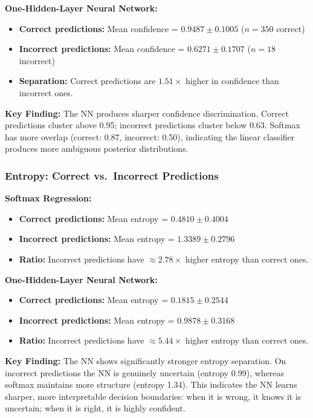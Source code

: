 \documentclass[sigconf,screen,nonacm]{acmart}
\begin{document}
\noindent\textbf{One-Hidden-Layer Neural Network:}
\begin{itemize}
    \item \textbf{Correct predictions:} Mean confidence = $0.9487 \pm 0.1005$ ($n=350$ correct)
    \item \textbf{Incorrect predictions:} Mean confidence = $0.6271 \pm 0.1707$ ($n=18$ incorrect)
    \item \textbf{Separation:} Correct predictions are $1.51\times$ higher in confidence than incorrect ones.
\end{itemize}

\noindent\textbf{Key Finding:} The NN produces sharper confidence discrimination. Correct predictions cluster above 0.95; incorrect predictions cluster below 0.63. Softmax has more overlap (correct: 0.87, incorrect: 0.50), indicating the linear classifier produces more ambiguous posterior distributions.

\subsubsection{Entropy: Correct vs.\ Incorrect Predictions}

\noindent\textbf{Softmax Regression:}
\begin{itemize}
    \item \textbf{Correct predictions:} Mean entropy = $0.4810 \pm 0.4004$
    \item \textbf{Incorrect predictions:} Mean entropy = $1.3389 \pm 0.2796$
    \item \textbf{Ratio:} Incorrect predictions have $\approx 2.78\times$ higher entropy than correct ones.
\end{itemize}

\noindent\textbf{One-Hidden-Layer Neural Network:}
\begin{itemize}
    \item \textbf{Correct predictions:} Mean entropy = $0.1815 \pm 0.2544$
    \item \textbf{Incorrect predictions:} Mean entropy = $0.9878 \pm 0.3168$
    \item \textbf{Ratio:} Incorrect predictions have $\approx 5.44\times$ higher entropy than correct ones.
\end{itemize}

\noindent\textbf{Key Finding:} The NN shows significantly stronger entropy separation. On incorrect predictions the NN is genuinely uncertain (entropy 0.99), whereas softmax maintains more structure (entropy 1.34). This indicates the NN learns sharper, more interpretable decision boundaries: when it is wrong, it knows it is uncertain; when it is right, it is highly confident.
\end{document}
